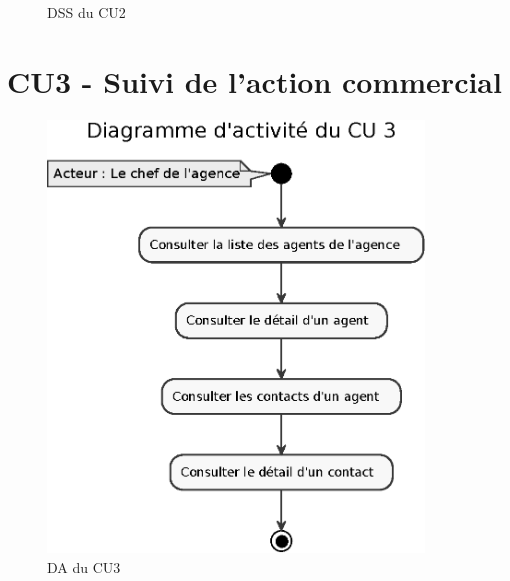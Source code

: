 \begin{figure}[H]
\noindent{}
\caption{DSS du CU2}
\end{figure}


\clearpage
\section{CU3 - Suivi de l’action commercial}

\begin{figure}[H]
\centering
\includegraphics[width=10cm]{figures/eps/DA_CU3.eps}
\caption{DA du CU3}
\end{figure}

